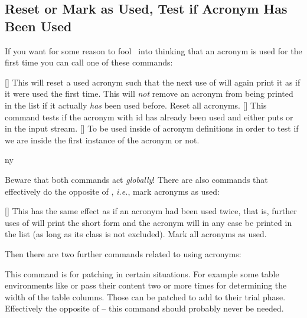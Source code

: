 \documentclass{acro-manual}
\newcommand*\latin[1]{\textit{#1}}
\begin{document}
\subsection{Reset or Mark as Used, Test if Acronym Has Been Used}

If you want for some reason to fool \acro\ into thinking that an acronym is
used for the first time you can call one of these commands:
\begin{commands}
  []
    This will reset a used acronym such that the next use of  will
    again print it as if it were used the first time.  This will \emph{not}
    remove an acronym from being printed in the list if it actually \emph{has}
    been used before.
    Reset all acronyms.
  []
    This command tests if the acronym with \ac{id}  has already been
    used and either puts  or  in the input stream.
  []
    To be used inside of acronym definitions in order to
    test if we are inside the first instance of the acronym or not.
\end{commands}
\begin{example}
  \ac{ny}
\end{example}
Beware that both commands act \emph{globally}!  There are also commands that
effectively do the opposite of , \latin{i.e.}, mark acronyms as
used:
\begin{commands}
  []
    This has the same effect as if an acronym had been used twice, that is,
    further uses of  will print the short form and the acronym will in
    any case be printed in the list (as long as its class is not excluded).
    Mark all acronyms as used.
\end{commands}
Then there are two further commands related to using acronyms:
\begin{commands}
    This command is for patching in certain situations.  For
    example some table environments like  or  pass
    their content two or more times for determining the width of the table
    columns.  Those can be patched to add  to their trial
    phase.
    Effectively the opposite of  -- this
    command should probably never be needed.
\end{commands}
\end{document}

